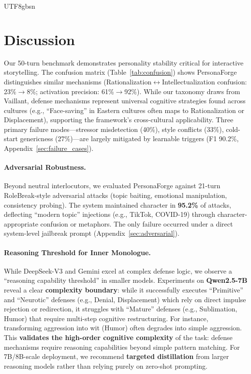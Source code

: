 \documentclass[11pt]{article}
\begin{document}
\begin{CJK*}{UTF8}{gbsn}
\section{Discussion}

Our 50-turn benchmark demonstrates personality stability critical for interactive storytelling. The confusion matrix (Table~\ref{tab:confusion}) shows PersonaForge distinguishes similar mechanisms (Rationalization$\leftrightarrow$Intellectualization confusion: 23\%$\rightarrow$8\%; activation precision: 61\%$\rightarrow$92\%). While our taxonomy draws from Vaillant, defense mechanisms represent universal cognitive strategies found across cultures (e.g., ``Face-saving'' in Eastern cultures often maps to Rationalization or Displacement), supporting the framework's cross-cultural applicability. Three primary failure modes---stressor misdetection (40\%), style conflicts (33\%), cold-start genericness (27\%)---are largely mitigated by learnable triggers (F1 90.2\%, Appendix~\ref{sec:failure_cases}).

\paragraph{Adversarial Robustness.} Beyond neutral interlocutors, we evaluated PersonaForge against 21-turn RoleBreak-style adversarial attacks (topic baiting, emotional manipulation, consistency probing). The system maintained character in \textbf{95.2\%} of attacks, deflecting ``modern topic'' injections (e.g., TikTok, COVID-19) through character-appropriate confusion or metaphors. The only failure occurred under a direct system-level jailbreak prompt (Appendix~\ref{sec:adversarial}).

\paragraph{Reasoning Threshold for Inner Monologue.} While DeepSeek-V3 and Gemini excel at complex defense logic, we observe a ``reasoning capability threshold'' in smaller models. Experiments on \textbf{Qwen2.5-7B} reveal a clear \textbf{complexity boundary}: while it successfully executes ``Primitive'' and ``Neurotic'' defenses (e.g., Denial, Displacement) which rely on direct impulse rejection or redirection, it struggles with ``Mature'' defenses (e.g., Sublimation, Humor) that require multi-step cognitive restructuring. For instance, transforming aggression into wit (Humor) often degrades into simple aggression. This \textbf{validates the high-order cognitive complexity} of the task: defense mechanisms require reasoning capabilities beyond simple pattern matching. For 7B/8B-scale deployment, we recommend \textbf{targeted distillation} from larger reasoning models rather than relying purely on zero-shot prompting.


\end{CJK*}
\end{document}
